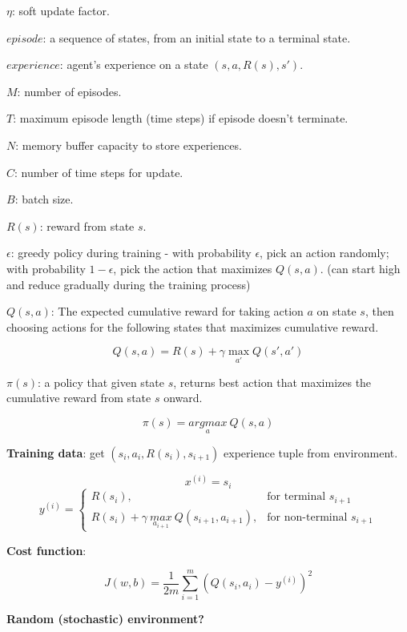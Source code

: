 \documentclass{article}
\begin{document}
\noindent \(\eta\): soft update factor.

\noindent \(episode\): a sequence of states, from an initial state to a terminal state.

\noindent \(experience\): agent's experience on a state \((s, a, R(s), s')\).

\noindent \(M\): number of episodes.

\noindent \(T\): maximum episode length (time steps) if episode doesn't terminate.

\noindent \(N\): memory buffer capacity to store experiences.

\noindent \(C\): number of time steps for update.

\noindent \(B\): batch size.

\noindent \(R(s)\): reward from state \(s\).

\noindent \(\epsilon\): greedy policy during training - with probability \(\epsilon\), pick an action randomly; with probability \(1 - \epsilon\), pick the action that maximizes \(Q(s, a)\). (can start high and reduce gradually during the training process)

\bigskip

\noindent \(Q(s, a)\): The expected cumulative reward for taking action \(a\) on state \(s\), then choosing actions for the following states that maximizes cumulative reward.

\[Q(s, a) = R(s) + \gamma \max_{a'} Q(s', a')\]

\noindent \(\pi(s)\): a policy that given state \(s\), returns best action that maximizes the cumulative reward from state \(s\) onward.

\[\pi(s) = \underset{a}{argmax} \ Q(s, a)\]

\noindent \textbf{Training data}: get \((s_{i}, a_{i}, R(s_{i}), s_{i+1})\) experience tuple from environment.

\[x^{(i)} = s_{i}\]
\[
y^{(i)} =
\begin{cases}
  R(s_{i}), & \text{for terminal } s_{i+1} \\
  R(s_{i}) + \gamma \ \underset{a_{i+1}}{max} \ Q(s_{i+1}, a_{i+1}), & \text{for non-terminal } s_{i+1}
\end{cases}
\]

\noindent \textbf{Cost function}:

\[J(w, b) = \frac{1}{2m} \sum_{i = 1}^m (Q(s_{i}, a_{i}) - y^{(i)})^2\]

\noindent \textbf{Random (stochastic) environment?}
\end{document}

